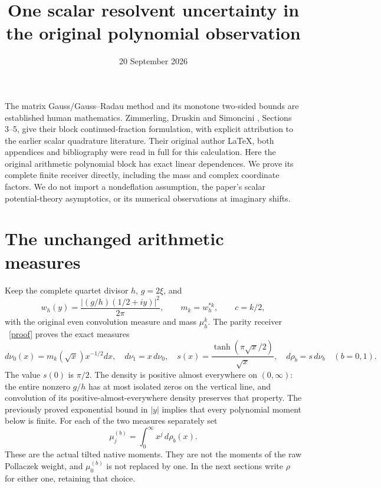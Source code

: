\documentclass[11pt]{article}
\title{One scalar resolvent uncertainty in the original polynomial observation}
\author{}
\date{20 September 2026}
\begin{document}
\maketitle
The matrix Gauss/Gauss--Radau method and its monotone two-sided bounds
are established human mathematics. Zimmerling, Druskin and Simoncini
\cite{ZDS}, Sections 3--5, give their block continued-fraction formulation,
with explicit attribution to the earlier scalar quadrature literature.
Their original author LaTeX, both appendices and bibliography were read
in full for this calculation. Here the original arithmetic polynomial
block has exact linear dependences. We prove its complete finite receiver
directly, including the mass and complex coordinate factors. We do not
import a nondeflation assumption, the paper's scalar potential-theory
asymptotics, or its numerical observations at imaginary shifts.

\section{The unchanged arithmetic measures}
Keep the complete quartet divisor $h$, $g=2\xi$, and
\[
 w_h(y)=\frac{|(g/h)(1/2+iy)|^2}{2\pi},\qquad
 m_k=w_h^{*k},\qquad c=k/2,
\]
with the original even convolution measure and mass $\mu_h^k$.
The parity receiver \cite{PP}%
~\href{https://github.com/KokunoYumeto/zeta-function-research-reader/blob/5992ad50c0f2a06921f1fcaded7b4e38097c0739/workbenches/splitzero-tandem/continuations/20260920-original-kernel-mixed-determinants/providers/PARITY_POLLACZEK_NATIVE_RECEIVER.tex\#L1}{[proof]}%
{} proves the exact measures
\[
 d\nu_0(x)=m_k(\sqrt x)x^{-1/2}dx,\quad d\nu_1=x\,d\nu_0,
 \quad s(x)=\frac{\tanh(\pi\sqrt x/2)}{\sqrt x},\quad
 d\rho_b=s\,d\nu_b\quad(b=0,1).
\]
The value $s(0)$ is $\pi/2$. The density is positive almost everywhere
on $(0,\infty)$: the entire nonzero $g/h$ has at most isolated zeros
on the vertical line, and convolution of its positive-almost-everywhere
density preserves that property. The previously proved exponential
bound in $|y|$ implies that every polynomial moment below is finite.
For each of the two measures separately set
\[
 \mu_j^{(b)}=\int_0^\infty x^j\,d\rho_b(x).
\]
These are the actual tilted native moments. They are not the moments
of the raw Pollaczek weight, and $\mu_0^{(b)}$ is not replaced by one.
In the next sections write $\rho$ for either one, retaining that choice.
\end{document}
